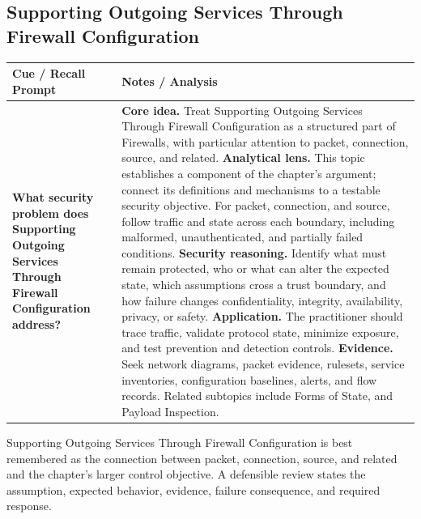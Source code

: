\documentclass[11pt]{article}
\newcommand{\CornellHeader}{%
\rowcolor{Navy}\color{white}\bfseries Cue / Recall Prompt & \color{white}\bfseries Notes / Analysis\\\hline}
\newcommand{\CornellRow}[2]{%
\cellcolor{CueGray}\RaggedRight\textbf{#1} & \RaggedRight #2\\\hline}
\begin{document}
\subsection*{Supporting Outgoing Services Through Firewall Configuration}
\begin{longtable}{>{\RaggedRight\arraybackslash}p{}|>{\RaggedRight\arraybackslash}p{}}
\CornellHeader
\CornellRow{What security problem does Supporting Outgoing Services Through Firewall Configuration address?}{\textbf{Core idea.} Treat Supporting Outgoing Services Through Firewall Configuration as a structured part of Firewalls, with particular attention to packet, connection, source, and related. \textbf{Analytical lens.} This topic establishes a component of the chapter's argument; connect its definitions and mechanisms to a testable security objective. For packet, connection, and source, follow traffic and state across each boundary, including malformed, unauthenticated, and partially failed conditions. \textbf{Security reasoning.} Identify what must remain protected, who or what can alter the expected state, which assumptions cross a trust boundary, and how failure changes confidentiality, integrity, availability, privacy, or safety. \textbf{Application.} The practitioner should trace traffic, validate protocol state, minimize exposure, and test prevention and detection controls. \textbf{Evidence.} Seek network diagrams, packet evidence, rulesets, service inventories, configuration baselines, alerts, and flow records. Related subtopics include Forms of State, and Payload Inspection.}
\end{longtable}
\begin{topicsummary}
Supporting Outgoing Services Through Firewall Configuration is best remembered as the connection between packet, connection, source, and related and the chapter's larger control objective. A defensible review states the assumption, expected behavior, evidence, failure consequence, and required response.
\end{topicsummary}
\end{document}
